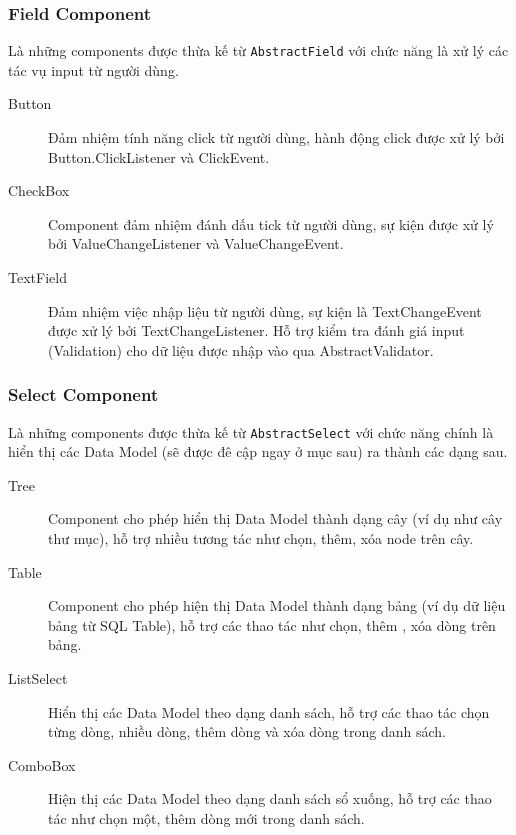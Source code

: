 \subsubsection{Field Component}
Là những components được thừa kế từ \verb|AbstractField| với chức năng là xử lý các tác vụ input từ người dùng.
\begin{description}
\item[Button] Đảm nhiệm tính năng click từ người dùng, hành động click được xử lý bởi Button.ClickListener và ClickEvent.
\item[CheckBox] Component đảm nhiệm đánh dấu tick từ người dùng, sự kiện được xử lý bởi ValueChangeListener và ValueChangeEvent.
\item[TextField] Đảm nhiệm việc nhập liệu từ người dùng, sự kiện là TextChangeEvent được xử lý bởi TextChangeListener. Hỗ trợ kiểm tra đánh giá input (Validation) cho dữ liệu được nhập vào qua AbstractValidator.
\end{description} 
\subsubsection{Select Component}
Là những components được thừa kế từ \verb|AbstractSelect| với chức năng chính là hiển thị các Data Model (sẽ được đê cập ngay ở mục sau) ra thành các dạng sau.
\begin{description}
\item[Tree] Component cho phép hiển thị Data Model thành dạng cây (ví dụ như cây thư mục), hỗ trợ nhiều tương tác như chọn, thêm, xóa node trên cây.
\item[Table] Component cho phép hiện thị Data Model thành dạng bảng (ví dụ dữ liệu bảng từ SQL Table), hỗ trợ các thao tác như chọn, thêm , xóa dòng trên bảng.
\item[ListSelect] Hiển thị các Data Model theo dạng danh sách, hỗ trợ các thao tác chọn từng dòng, nhiều dòng, thêm dòng và xóa dòng trong danh sách.
\item[ComboBox] Hiện thị các Data Model theo dạng danh sách sổ xuống, hỗ trợ các thao tác như chọn một, thêm dòng mới trong danh sách.
\end{description}
